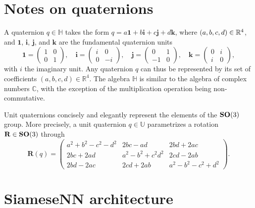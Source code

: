 \section{Notes on quaternions}

A quaternion $q\in\mathbb{H}$ takes the form
$q =  a\boldsymbol{1} + b\boldsymbol{i} + c\boldsymbol{j} + d\boldsymbol{k}$,
where $(a,b,c,d) \in \mathbb{R}^4$, and $\boldsymbol{1}$, $\boldsymbol{i}$, $\boldsymbol{j}$, and $\boldsymbol{k}$ are the fundamental quaternion units
\begin{equation*}
    \boldsymbol{1} = \begin{pmatrix} 1 & 0 \\ 0 & 1 \end{pmatrix}, \quad
    \boldsymbol{i} = \begin{pmatrix} i & 0 \\ 0 & -i \end{pmatrix}, \quad
    \boldsymbol{j} = \begin{pmatrix} 0 & 1 \\ -1 & 0 \end{pmatrix}, \quad
    \boldsymbol{k} = \begin{pmatrix} 0 & i \\ i & 0 \end{pmatrix},
\end{equation*}
with $i$ the imaginary unit.
Any quaternion $q$ can thus be represented by its set of coefficients $(a,b,c,d)\in\mathbb{R}^4$.
The algebra $\mathbb{H}$ is similar to the algebra of complex numbers $\mathbb{C}$, with the exception of the multiplication operation being non-commutative.

Unit quaternions concisely and elegantly represent the elements of the $\mathrm{\mathbf{SO}}(3)$ group.
More precisely, a unit quaternion $q\in\mathbb{U}$ parametrizes a rotation $\mathbf{R}\in\mathrm{\mathbf{SO}}(3)$ through
\begin{equation*}
    \mathbf{R}(q) = \begin{pmatrix}
    a^2+b^2-c^2-d^2 & 2bc-ad & 2bd+2ac \\
    2bc+2ad & a^2-b^2+c^2d^2 & 2cd-2ab \\
    2bd-2ac & 2cd+2ab & a^2-b^2-c^2+d^2
    \end{pmatrix}.
\end{equation*}

\newpage
\section{SiameseNN architecture}\label{sec:siamese-architecture}

